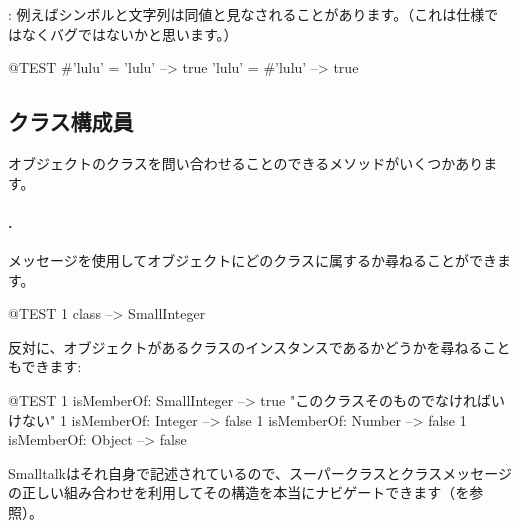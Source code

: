 \documentclass[a4paper,10pt,twoside]{book}
\begin{document}
: 例えばシンボルと文字列は同値と見なされることがあります。（これは仕様ではなくバグではないかと思います。）

\begin{code}{@TEST}
#'lulu' = 'lulu' --> true
'lulu' = #'lulu' --> true
\end{code}


\subsection{クラス構成員}
オブジェクトのクラスを問い合わせることのできるメソッドがいくつかあります。

\paragraph{.} メッセージを使用してオブジェクトにどのクラスに属するか尋ねることができます。
\begin{code}{@TEST}
1 class --> SmallInteger
\end{code}

反対に、オブジェクトがあるクラスのインスタンスであるかどうかを尋ねることもできます:
\begin{code}{@TEST}
1 isMemberOf: SmallInteger --> true    "このクラスそのものでなければいけない"
1 isMemberOf: Integer          --> false
1 isMemberOf: Number        --> false
1 isMemberOf: Object           --> false
\end{code}

Smalltalkはそれ自身で記述されているので、スーパークラスとクラスメッセージの正しい組み合わせを利用してその構造を本当にナビゲートできます（を参照）。
\end{document}
